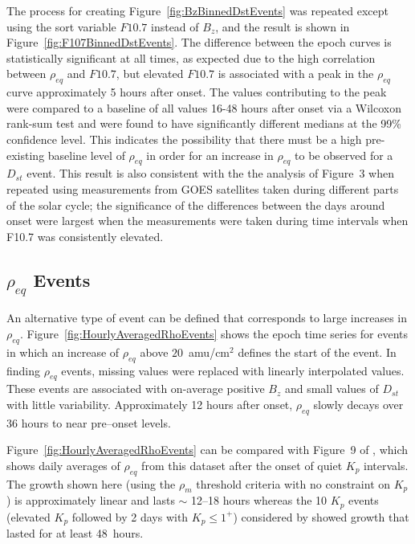 \documentclass[12pt]{article}
\begin{document}

The process for creating Figure~\ref{fig:BzBinnedDstEvents} was repeated except using the sort variable $F10.7$ instead of $B_z$, and the result is shown in Figure~\ref{fig:F107BinnedDstEvents}. The difference between the epoch curves is statistically significant at all times, as expected due to the high correlation between $\rho_{eq}$ and $F10.7$, but elevated $F10.7$ is associated with a peak in the $\rho_{eq}$ curve approximately 5 hours after onset. The values contributing to the peak were compared to a baseline of all values 16-48 hours after onset via a Wilcoxon rank-sum test and were found to have significantly different medians at the 99\% confidence level.  This indicates the possibility that there must be a high pre-existing baseline level of $\rho_{eq}$ in order for an increase in $\rho_{eq}$ to be observed for a $D_{st}$ event.  This result is also consistent with the the analysis of Figure~3 when repeated using measurements from GOES satellites taken during different parts of the solar cycle; the significance of the differences between the days around onset were largest when the measurements were taken during time intervals when F10.7 was consistently elevated.

\subsection{$\rho_{eq}$ Events}

An alternative type of event can be defined that corresponds to large increases in $\rho_{eq}$.  Figure~\ref{fig:HourlyAveragedRhoEvents} shows the epoch time series for events in which an increase of $\rho_{eq}$ above $20$~amu/cm$^2$ defines the start of the event. In finding $\rho_{eq}$ events, missing values were replaced with linearly interpolated values.  These events are associated with on-average positive $B_z$ and small values of $D_{st}$ with little variability.  Approximately 12 hours after onset, $\rho_{eq}$ slowly decays over 36 hours to near pre--onset levels.  

Figure~\ref{fig:HourlyAveragedRhoEvents} can be compared with Figure~9 of \cite{Denton2016}, which shows daily averages of $\rho_{eq}$ from this dataset after the onset of quiet $K_p$ intervals.  The growth shown here (using the $\rho_m$ threshold criteria with no constraint on $K_p$) is approximately linear and lasts $\sim$ 12--18 hours whereas the 10 $K_p$ events (elevated $K_p$ followed by 2 days with $K_p \le 1^+$) considered by \cite{Denton2016} showed growth that lasted for at least 48~hours. 
\end{document}
